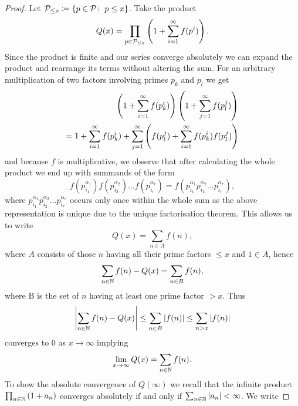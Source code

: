 \begin{proof}
	Let $\mathcal{P}_{\leq x} \coloneqq \left\{p \in \mathcal{P} \colon \; p \leq x\right\}$. Take the product
\begin{equation*}
	Q(x) = \prod_{p \in \mathcal{P}_{\leq x}} \left(1 + \sum_{i = 1}^\infty f(p^i)\right).
\end{equation*}
	Since the product is finite and our series converge absolutely we can expand the product and rearrange its terms without altering the sum. For an arbitrary multiplication of two factors involving primes $p_k$ and $p_l$ we get
\begin{equation*}
\begin{aligned}		
	\left(1 + \sum_{i = 1}^\infty f(p_k^i)\right) \left(1 + \sum_{j = 1}^\infty f(p_l^j)\right) \\
	= 1 + \sum_{i = 1}^\infty f(p_k^i) + \sum_{j = 1}^\infty \left(f(p_l^j) + \sum_{i = 1}^\infty f(p_k^i) f(p_l^j)\right)
\end{aligned}
\end{equation*}
	and because $f$ is multiplicative, we observe that after calculating the whole product we end up with summands of the form
\begin{equation*}
	f(p_{i_1}^{\alpha_1})f(p_{i_2}^{\alpha_2}) \dots f(p_{i_r}^{\alpha_r}) = f(p_{i_1}^{\alpha_1} p_{i_2}^{\alpha_2} \dots p_{i_r}^{\alpha_r}),
\end{equation*}
	where $p_{i_1}^{\alpha_1} p_{i_2}^{\alpha_2} \dots p_{i_r}^{\alpha_r}$ occurs only once within the whole sum as the above representation is unique due to the unique factorisation theorem. This allows us to write
\begin{equation*}
	Q(x) = \sum_{n \in A} f(n),
\end{equation*}
	where $A$ consists of those $n$ having all their prime factors $\leq x$ and $1 \in A$, hence
\begin{equation*}
	\sum_{n \in \mathbb{N}} f(n)	 - Q(x) = \sum_{n \in B} f(n),
\end{equation*}
	where B is the set of $n$ having at least one prime factor $> x$. Thus
\begin{equation*}
	\left|\sum_{n \in \mathbb{N}} f(n) - Q(x)\right| \leq \sum_{n \in B} \left|f(n)\right| \leq \sum_{n > x} \left|f(n)\right|
\end{equation*}
	converges to $0$ as $x \to \infty$ implying
\begin{equation*}	
	\lim\limits_{x \to \infty} Q(x) = \sum_{n \in \mathbb{N}} f(n).
\end{equation*}
	To show the absolute convergence of $Q(\infty)$ we recall that the infinite product $\prod_{n \in \mathbb{N}} \left(1 + a_n\right)$ converges absolutely if and only if $\sum_{n \in \mathbb{N}} \left|a_n\right| < \infty$. We write

\end{proof}
